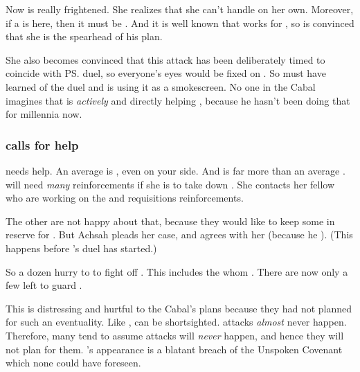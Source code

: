 Now \Achsah{} is really frightened. 
She realizes that she can't handle \Nzessuacrith{} on her own. 
Moreover, if a \dragon{} is here, then it must be . 
And it is well known that \Nzessuacrith{} works for \Secherdamon, so \Achsah{} is convinced that she is the spearhead of his plan. 

She also becomes convinced that this attack has been deliberately timed to coincide with \ps{\Teshrial} duel, so everyone's eyes would be fixed on \Malcur. 
So \Secherdamon{} must have learned of the duel and is using it as a smokescreen. 
No one in the Cabal imagines that \Ishnaruchaefir{} is \emph{actively} and directly helping \Secherdamon, because he hasn't been doing that for millennia now. 






\subsubsection{\Achsah calls for help}
\Achsah{} needs help. 
An average \dragon is , even  on your side.
And \Nzessuacrith is far more than an average \dragon. 
\Achsah will need \emph{many} reinforcements if she is to take down \Nzessuacrith. 
She contacts her fellow \resphain who are working on the  and requisitions reinforcements. 

The other \resphain are not happy about that, because they would like to keep some in reserve for \Ishnaruchaefir.
But Achsah pleads her case, and \Teshrial agrees with her (because he ).
(This happens before \Teshrial's duel has started.)

So a dozen \resphain hurry to \Forclin to fight off \Nzessuacrith. 
This includes the \resphain{} whom \Teshrial{} . 
There are now only a few left to guard \Malcur. 

This is distressing and hurtful to the Cabal's plans because they had not planned for such an eventuality. 
Like \humans, \resphain can be shortsighted.
\Dragon attacks \emph{almost} never happen.
Therefore, many \resphain tend to assume \dragon attacks will \emph{never} happen, and hence they will not plan for them. 
\Nzessuacrith's appearance is a blatant breach of the Unspoken Covenant which none could have foreseen.

